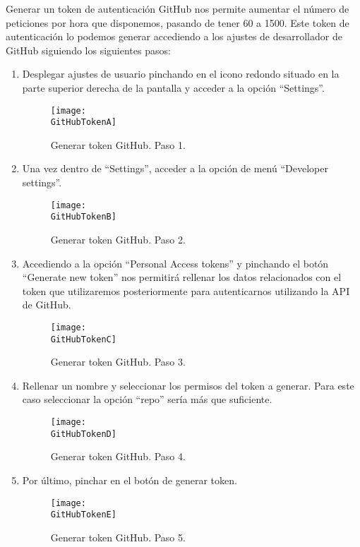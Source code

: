 Generar un token de autenticación GitHub nos permite aumentar el número de peticiones por hora que disponemos, pasando de tener 60 a 1500.
Este token de autenticación lo podemos generar accediendo a los ajustes de desarrollador de GitHub siguiendo los siguientes pasos:

\begin{enumerate}
    \item Desplegar ajustes de usuario pinchando en el icono redondo situado en la parte superior derecha de la pantalla y acceder a la opción ``Settings''.

    \begin{figure}[h]
        \centering
        \texttt{[image: \\GitHubTokenA]}
        \caption{Generar token GitHub. Paso 1.}
    \end{figure}

    \item Una vez dentro de “Settings”, acceder a la opción de menú ``Developer settings''.

    \begin{figure}[h]
        \centering
        \texttt{[image: \\GitHubTokenB]}
        \caption{Generar token GitHub. Paso 2.}
    \end{figure}

    \item Accediendo a la opción ``Personal Access tokens'' y pinchando el botón ``Generate new token'' nos permitirá rellenar los datos relacionados con el token que utilizaremos posteriormente para autenticarnos utilizando la API de GitHub.
    
    \begin{figure}[h]
        \centering
        \texttt{[image: \\GitHubTokenC]}
        \caption{Generar token GitHub. Paso 3.}
    \end{figure}

    \item Rellenar un nombre y seleccionar los permisos del token a generar. Para este caso seleccionar la opción ``repo'' sería más que suficiente.
    
    \begin{figure}[h]
        \centering
        \texttt{[image: \\GitHubTokenD]}
        \caption{Generar token GitHub. Paso 4.}
    \end{figure}

    \item Por último, pinchar en el botón de generar token.

    \begin{figure}[h]
        \centering
        \texttt{[image: \\GitHubTokenE]}
        \caption{Generar token GitHub. Paso 5.}
    \end{figure}

\end{enumerate}